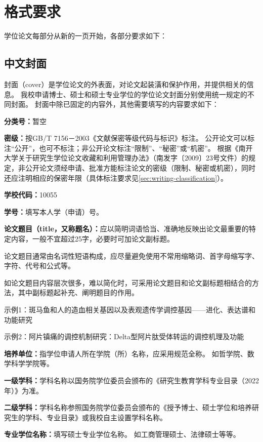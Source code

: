 \chapter{格式要求}
\label{chap:format-requirements}

学位论文每部分从新的一页开始，各部分要求如下：

\section{中文封面}
\label{sec:format-cover}

封面（cover）是学位论文的外表面，对论文起装潢和保护作用，并提供相关的信息。
我校申请博士、硕士和硕士专业学位的学位论文封面分别使用统一规定的不同封面。
封面中除已固定的内容外，其他需要填写的内容要求如下：

\textbf{分类号：}暂空

\textbf{密级：}按GB/T 7156－2003《文献保密等级代码与标识》标注。
公开论文可以标注“公开”，也可不标注；非公开论文标注“限制”、“秘密”或“机密”。
根据《南开大学关于研究生学位论文收藏和利用管理办法》（南发字〔2009〕23号文件）的规定，非公开论文须经申请、批准方能标注论文的密级（限制、秘密或机密），同时还应注明相应的保密年限（具体标注要求见\ref{sec:writing-classification}）。

\textbf{学校代码：}10055

\textbf{学号：}填写本人学（申请）号。

\textbf{论文题目（title，又称题名）：}应以简明词语恰当、准确地反映出论文最重要的特定内容，一般不宜超过25字，必要时可加论文副标题。

论文题目通常由名词性短语构成，应尽量避免使用不常用缩略词、首字母缩写字、字符、代号和公式等。

如论文题目内容层次很多，难以简化时，可采用论文题目和论文副标题相结合的方法，其中副标题起补充、阐明题目的作用。

示例1：斑马鱼和人的造血相关基因以及表观遗传学调控基因——进化、表达谱和功能研究

示例2：阿片镇痛的调控机制研究：Delta型阿片肽受体转运的调控机理及功能

\textbf{培养单位：}指学位申请人所在学院（所）名称，应采用规范全称。
如哲学院、数学科学学院等。

\textbf{一级学科：}学科名称以国务院学位委员会颁布的《研究生教育学科专业目录（2022年）》为准。

\textbf{二级学科：}学科名称参照国务院学位委员会颁布的《授予博士、硕士学位和培养研究生的学科、专业目录》或我校自主设置学科名称。

\textbf{专业学位名称：}填写硕士专业学位名称。
如工商管理硕士、法律硕士等等。

